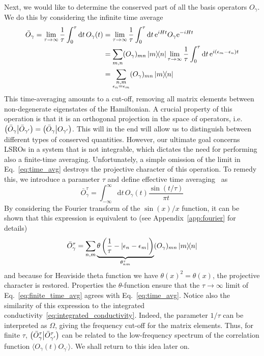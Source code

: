 Next, we would like to determine the conserved part of all the basis operators \(O_{\gamma}\). We do this
by considering the infinite time average 
\begin{align}
    \bar{O}_{\gamma} = \lim_{\tau\to\infty}\frac{1}{\tau} \int_0^{\tau} \mathrm{d}t\, O_{\gamma}(t) &= 
     \lim_{\tau\to\infty}\frac{1}{\tau} \int_0^{\tau} \mathrm{d}t\, \mathrm{e}^{i H t}O_{\gamma} \mathrm{e}^{-i H t} \nonumber\\
     &= \sum_{m,n} (O_{\gamma})_{mn}\ketbra{m}{n} \lim_{\tau\to\infty} \frac{1}{\tau} \int_0^{\tau} \mathrm{d}t \, \mathrm{e}^{i(\epsilon_m-\epsilon_n)t} \nonumber\\
    &= \sum_{\substack{n,m \\ \epsilon_n = \epsilon_m}} (O_{\gamma})_{mn}\ketbra{m}{n}
    \label{eq:time_avg}
\end{align}
This time-averaging amounts to a cut-off, removing all matrix elements between non-degenerate eigenstates
of the Hamiltonian. A crucial property of this operation is that it is an orthogonal projection
in the space of operators, i.e. \(\left(\bar{O}_{\gamma} \middle| \bar{O}_{\gamma^{\prime}}\right) = \left(\bar{O}_{\gamma} \middle| O_{\gamma^{\prime}}\right)\). This will
in the end will allow us to distinguish between different types of conserved quantities.
However, our ultimate goal concerns LSROs in a system that is not integrable, which dictates the
need for performing also a finite-time averaging. Unfortunately, a simple omission of the limit
in Eq.~\eqref{eq:time_avg} destroys the projective character of this operation. To remedy this,
we introduce a parameter \(\tau\) and define effective time averaging~\autocite{Mierzejewski2015}
as
\begin{equation}
    \bar{O}_{\gamma}^{\tau} = \int_{-\infty}^{\infty} \mathrm{d}t\, O_{\gamma}(t) \frac{\sin(t/\tau)}{\pi t}
\end{equation}
By considering the Fourier transform of the \(\sin(x)/x\) function, it can be shown that
this expression is equivalent to (see Appendix~\ref{app:fourier} for details)
\begin{equation}
    \bar{O}_{\gamma}^{\tau} = \sum_{n,m} \underbrace{\theta\left(\frac{1}{\tau} - |\epsilon_n - \epsilon_m|\right)}_{\theta_{nm}^{\tau}} (O_{\gamma})_{mn} \ketbra{m}{n}
\label{eq:finite_time_avg}
\end{equation}
and because for Heaviside theta function we have \(\theta(x)^2 = \theta(x)\), the projective character is restored. 
Properties the \(\theta\)-function ensure that the \(\tau\to\infty\) limit of Eq.~\eqref{eq:finite_time_avg}
agrees with Eq.~\eqref{eq:time_avg}. Notice also the similarity of this expression to the integrated conductivity~\eqref{eq:integrated_conductivity}.
Indeed, the parameter \(1/\tau\) can be interpreted as \(\Omega\), giving the frequency cut-off for the matrix elements.
Thus, for finite \(\tau\), \(\left(\bar{O}_{\gamma}^{\tau} \middle| \bar{O}_{\gamma^{\prime}}^{\tau}\right)\) can be related to the low-frequency spectrum of 
the correlation function \(\langle O_{\gamma}(t) O_{\gamma^{\prime}} \rangle\). We shall return to this idea later on.

